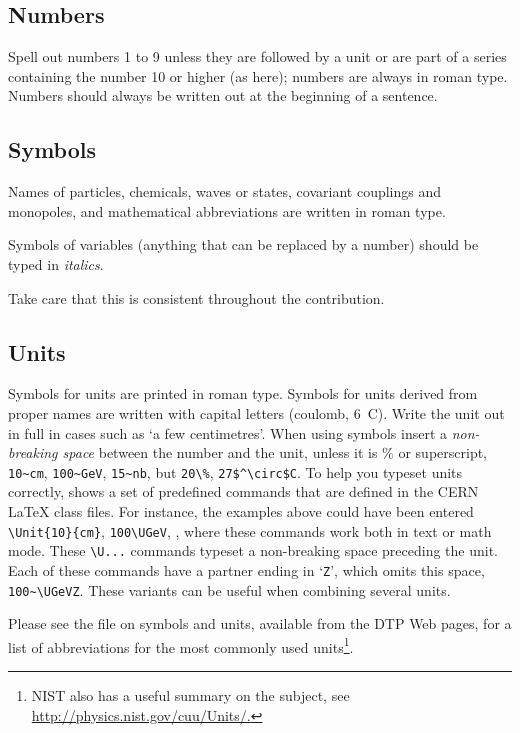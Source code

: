 \documentclass{cernyrep}
\begin{document}
\subsection{Numbers}

Spell out numbers 1 to 9 unless they are followed by a unit or are
part of a series containing the number 10 or higher (as here); numbers
are always in roman type. Numbers should always be written out at the
beginning of a sentence.

\subsection{Symbols}

Names of particles, chemicals, waves or states, covariant couplings
and monopoles, and mathematical abbreviations are written in roman
type.

Symbols of variables (\ie anything that can be replaced by a number)
should be typed in \emph{italics}.

Take care that this is consistent throughout the contribution.

\subsection{Units}

Symbols for units are printed in roman type. Symbols for units derived
from proper names are written with capital letters (\eg coulomb, 6~C).
Write the unit out in full in cases such as `a few centimetres'.  When
using symbols insert a \emph{non-breaking space} between the number
and the unit, unless it is $\%$ or superscript, \eg \verb!10~cm!,
\verb!100~GeV!, \verb!15~nb!, but \verb!20\%!, \verb!27$^\circ$C!. To
help you typeset units correctly,  shows a set of
predefined commands that are defined in the CERN \LaTeX{} class files.
For instance, the examples above could have been entered
\verb!\Unit{10}{cm}!, \verb!100\UGeV!, \etc, where these commands work
both in text or math mode. These \verb!\U...! commands typeset a
non-breaking space preceding the unit.  Each of these commands have a
partner ending in `\texttt{Z}', which omits this space, \eg
\verb!100~\UGeVZ!. These variants can be useful when combining several
units.

Please see the file on symbols and units, available from the DTP Web
pages, for a list of abbreviations for the most commonly used
units\footnote{NIST also has a useful summary on the subject, see
\url{http://physics.nist.gov/cuu/Units/.}}.
\end{document}
